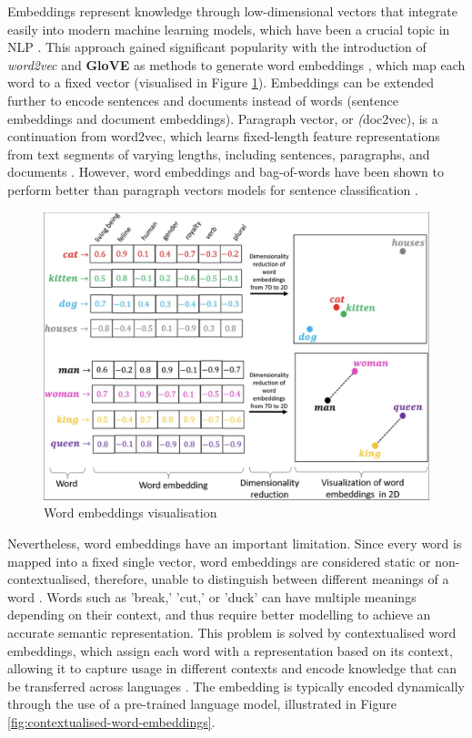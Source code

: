 Embeddings represent knowledge through low-dimensional vectors that integrate easily into modern machine learning models, which have been a crucial topic in NLP \cite{camacho-collados-2020-embeddings}. This approach gained significant popularity with the introduction of \textit{word2vec} and \textbf{GloVE} \cite{pennington-2014-glove} as methods to generate word embeddings \cite{mikolov-2013-embeddings}, which map each word to a fixed vector (visualised in Figure \ref{fig:word-embeddings}). Embeddings can be extended further to encode sentences and documents instead of words (sentence embeddings and document embeddings). Paragraph vector, or \textit(doc2vec), is a continuation from word2vec, which learns fixed-length feature representations from text segments of varying lengths, including sentences, paragraphs, and documents \cite{mikolov-2014-doc2vec}. However, word embeddings and bag-of-words have been shown to perform better than paragraph vectors models for sentence classification \cite{white-2015-how-well-sentence-embeddings}.


\begin{figure}[htbp]
    \centering
    \includegraphics[width=0.8\linewidth]{images/word_embeddings.png}
    \caption{Word embeddings visualisation \cite{narayanan-2019-word-embeddings}}
    \label{fig:word-embeddings}
\end{figure}


Nevertheless, word embeddings have an important limitation. Since every word is mapped into a fixed single vector, word embeddings are considered static or non-contextualised, therefore, unable to distinguish between different meanings of a word \cite{camacho-collados-2020-embeddings}. Words such as 'break,' 'cut,' or 'duck' can have multiple meanings depending on their context, and thus require better modelling to achieve an accurate semantic representation. This problem is solved by contextualised word embeddings, which assign each word with a representation based on its context, allowing it to capture usage in different contexts and encode knowledge that can be transferred across languages \cite{liu-2020-survey-contextual-embeddings}. The embedding is typically encoded dynamically through the use of a pre-trained language model, illustrated in Figure \ref{fig:contextualised-word-embeddings}.

